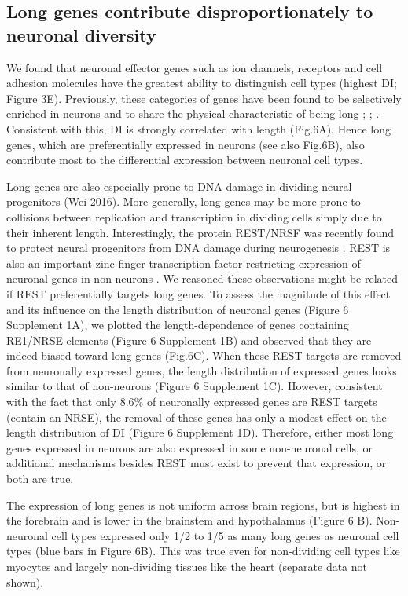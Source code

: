 \subsection{Long genes contribute disproportionately to neuronal diversity}

We found that neuronal effector genes such as ion channels, receptors and cell adhesion molecules have the greatest ability to distinguish cell types (highest DI; Figure 3E). Previously, these categories of genes have been found to be selectively enriched in neurons and to share the physical characteristic of being long \cite{Sugino_2014}; \cite{Gabel_2015}; \cite{Zylka_2015}. Consistent with this, DI is strongly correlated with length (Fig.6A). Hence long genes, which are preferentially expressed in neurons (see also Fig.6B), also contribute most to the differential expression between neuronal cell types. 

Long genes are also especially prone to DNA damage in dividing neural progenitors (Wei 2016). More generally, long genes may be more prone to collisions between replication and transcription in dividing cells simply due to their inherent length. Interestingly, the protein REST/NRSF was recently found to protect neural progenitors from DNA damage during neurogenesis \cite{Nechiporuk_2016}. REST is also an important zinc-finger transcription factor restricting expression of neuronal genes in non-neurons \cite{RN1}\cite{RN2a}. We reasoned these observations might be related if REST preferentially targets long genes. To assess the magnitude of this effect and its influence on the length distribution of neuronal genes (Figure 6 Supplement 1A), we plotted the length-dependence of genes containing RE1/NRSE elements (Figure 6 Supplement 1B) and observed that they are indeed biased toward long genes (Fig.6C). When these REST targets are removed from neuronally expressed genes, the length distribution of expressed genes looks similar to that of non-neurons (Figure 6 Supplement 1C). However, consistent with the fact that only 8.6\% of neuronally expressed genes are REST targets (contain an NRSE), the removal of these genes has only a modest effect on the length distribution of DI (Figure 6 Supplement 1D). Therefore, either most  long genes expressed in neurons are also expressed in some non-neuronal cells, or additional mechanisms besides REST must exist to prevent that expression, or both are true. 

The expression of long genes is not uniform across brain regions, but is highest in the forebrain and is lower in the brainstem and hypothalamus (Figure 6 B). Non-neuronal cell types expressed only 1/2 to 1/5 as many long genes as neuronal cell types (blue bars in Figure 6B). This was true even for non-dividing cell types like myocytes and largely non-dividing tissues like the heart (separate data not shown).

